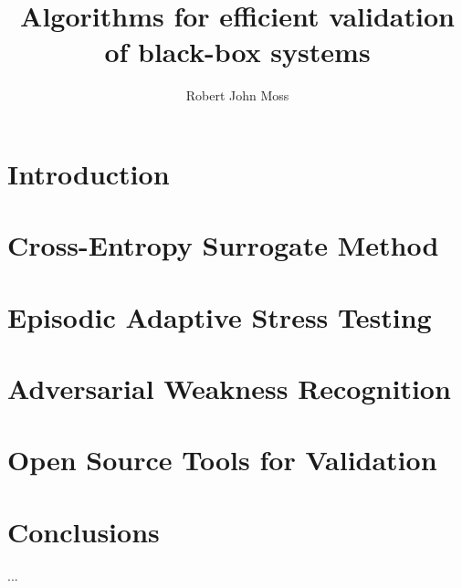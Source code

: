 \documentclass{report}
\def\includebody{} %
\begin{document}
\title{Algorithms for efficient validation of black-box systems}
\author{Robert John Moss}


\beforepreface
{}

% 

\afterpreface


\chapter{Introduction}


\ifdefined\includebody
    \chapter{Cross-Entropy Surrogate Method}\label{cha:cem_variants}
    

    \chapter{Episodic Adaptive Stress Testing}\label{cha:episodic_ast}
    

    \chapter{Adversarial Weakness Recognition}\label{cha:weakness_rec}
    

    \chapter{Open Source Tools for Validation}\label{cha:tooling}
    
\fi

\chapter{Conclusions}
...

\appendix
\ifdefined\includebody
    
\fi

% 
% 
\printbibliography
\end{document}
